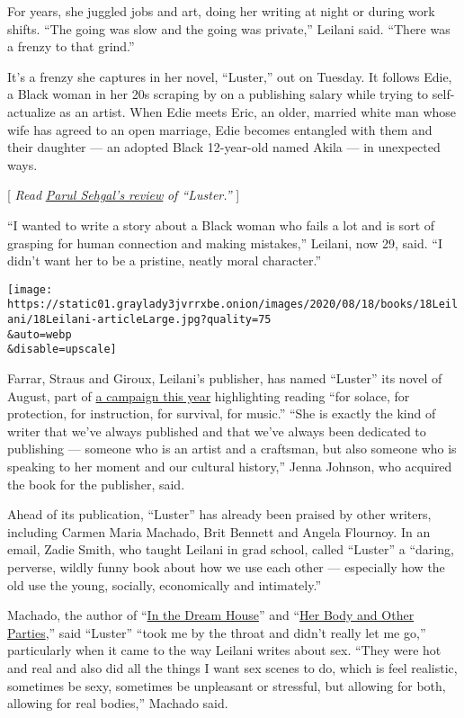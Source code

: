 For years, she juggled jobs and art, doing her writing at night or
during work shifts. ``The going was slow and the going was private,''
Leilani said. ``There was a frenzy to that grind.''

It's a frenzy she captures in her novel, ``Luster,'' out on Tuesday. It
follows Edie, a Black woman in her 20s scraping by on a publishing
salary while trying to self-actualize as an artist. When Edie meets
Eric, an older, married white man whose wife has agreed to an open
marriage, Edie becomes entangled with them and their daughter --- an
adopted Black 12-year-old named Akila --- in unexpected ways.

{[} \emph{Read}
\href{https://www.nytimes3xbfgragh.onion/2020/08/04/books/review-luster-raven-leilani.html}{\emph{Parul
Sehgal's review}} \emph{of ``Luster.''} {]}

``I wanted to write a story about a Black woman who fails a lot and is
sort of grasping for human connection and making mistakes,'' Leilani,
now 29, said. ``I didn't want her to be a pristine, neatly moral
character.''

\texttt{[image: https://static01.graylady3jvrrxbe.onion/images/2020/08/18/books/18Leilani/18Leilani-articleLarge.jpg?quality=75\\\&auto=webp\\\&disable=upscale]}

Farrar, Straus and Giroux, Leilani's publisher, has named ``Luster'' its
novel of August, part of \href{https://fsg2020.com/}{a campaign this
year} highlighting reading ``for solace, for protection, for
instruction, for survival, for music.'' ``She is exactly the kind of
writer that we've always published and that we've always been dedicated
to publishing --- someone who is an artist and a craftsman, but also
someone who is speaking to her moment and our cultural history,'' Jenna
Johnson, who acquired the book for the publisher, said.

Ahead of its publication, ``Luster'' has already been praised by other
writers, including Carmen Maria Machado, Brit Bennett and Angela
Flournoy. In an email, Zadie Smith, who taught Leilani in grad school,
called ``Luster'' a ``daring, perverse, wildly funny book about how we
use each other --- especially how the old use the young, socially,
economically and intimately.''

Machado, the author of
``\href{https://www.nytimes3xbfgragh.onion/2019/10/29/books/in-dream-house-memoir-carmen-maria-machado.html}{In
the Dream House}'' and
``\href{https://www.nytimes3xbfgragh.onion/2017/10/04/books/review-her-body-and-other-parties-carmen-maria-machado.html}{Her
Body and Other Parties},'' said ``Luster'' ``took me by the throat and
didn't really let me go,'' particularly when it came to the way Leilani
writes about sex. ``They were hot and real and also did all the things I
want sex scenes to do, which is feel realistic, sometimes be sexy,
sometimes be unpleasant or stressful, but allowing for both, allowing
for real bodies,'' Machado said.

